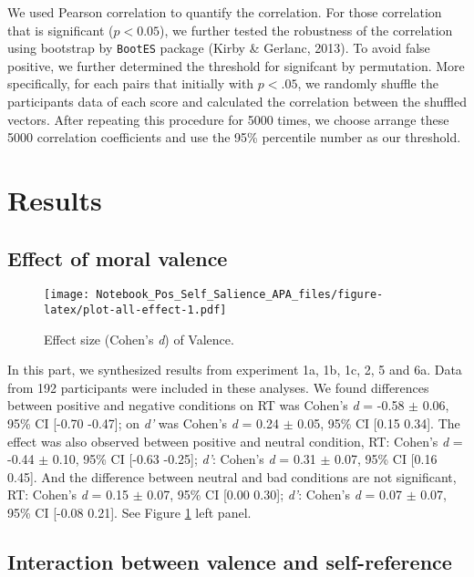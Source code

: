 \documentclass[
  english,
  man]{apa6}
\begin{document}
We used Pearson correlation to quantify the correlation. For those correlation that is significant (\(p < 0.05\)), we further tested the robustness of the correlation using bootstrap by \texttt{BootES} package (Kirby \& Gerlanc, 2013). To avoid false positive, we further determined the threshold for signifcant by permutation. More specifically, for each pairs that initially with \(p < .05\), we randomly shuffle the participants data of each score and calculated the correlation between the shuffled vectors. After repeating this procedure for 5000 times, we choose arrange these 5000 correlation coefficients and use the 95\% percentile number as our threshold.

\hypertarget{results-1}{%
\section{Results}\label{results-1}}

\hypertarget{effect-of-moral-valence}{%
\subsection{Effect of moral valence}\label{effect-of-moral-valence}}

\begin{figure}
\centering
\texttt{[image: Notebook\_Pos\_Self\_Salience\_APA\_files/figure-latex/plot-all-effect-1.pdf]}
\caption{\label{fig:plot-all-effect}Effect size (Cohen's \emph{d}) of Valence.}
\end{figure}

In this part, we synthesized results from experiment 1a, 1b, 1c, 2, 5 and 6a. Data from 192 participants were included in these analyses. We found differences between positive and negative conditions on RT was Cohen's \emph{d} = -0.58 \(\pm\) 0.06, 95\% CI {[}-0.70 -0.47{]}; on \emph{d'} was Cohen's \emph{d} = 0.24 \(\pm\) 0.05, 95\% CI {[}0.15 0.34{]}. The effect was also observed between positive and neutral condition, RT: Cohen's \emph{d} = -0.44 \(\pm\) 0.10, 95\% CI {[}-0.63 -0.25{]}; \emph{d'}: Cohen's \emph{d} = 0.31 \(\pm\) 0.07, 95\% CI {[}0.16 0.45{]}. And the difference between neutral and bad conditions are not significant, RT: Cohen's \emph{d} = 0.15 \(\pm\) 0.07, 95\% CI {[}0.00 0.30{]}; \emph{d'}: Cohen's \emph{d} = 0.07 \(\pm\) 0.07, 95\% CI {[}-0.08 0.21{]}. See Figure \ref{fig:plot-all-effect} left panel.

\hypertarget{interaction-between-valence-and-self-reference}{%
\subsection{Interaction between valence and self-reference}\label{interaction-between-valence-and-self-reference}}
\end{document}
